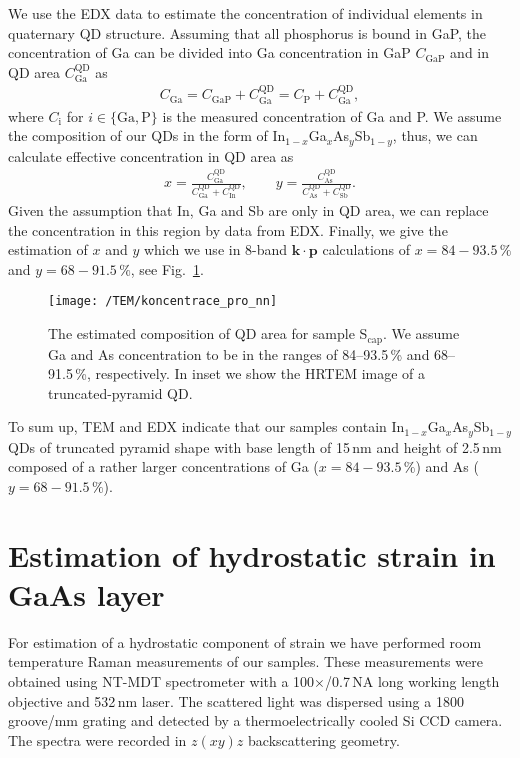 We use the EDX data to estimate the concentration of individual elements in quaternary QD structure. Assuming that all phosphorus is bound in GaP, the concentration of Ga can be divided into Ga concentration in GaP $C_\mathrm{GaP}$ and in QD area $C_\mathrm{Ga}^\mathrm{QD}$ as
%
\begin{eqnarray}
C_\mathrm{Ga}=C_\mathrm{GaP}+C_\mathrm{Ga}^\mathrm{QD}=C_\mathrm{P}+C_\mathrm{Ga}^\mathrm{QD},
\end{eqnarray}
%
where $C_\mathrm{i}$ for $i \in \{\mathrm{Ga}, \mathrm{P}\}$ is the measured concentration of Ga and P. We assume the composition of our QDs in the form of In$_{1-x}$Ga$_{x}$As$_y$Sb$_{1-y}$, thus, we can calculate effective concentration in QD area as
%
\begin{eqnarray}
x=\frac{C_\mathrm{Ga}^\mathrm{QD}}{C_\mathrm{Ga}^\mathrm{QD}+C_\mathrm{In}^\mathrm{QD}},\qquad
y=\frac{C_\mathrm{As}^\mathrm{QD}}{C_\mathrm{As}^\mathrm{QD}+C_\mathrm{Sb}^\mathrm{QD}}.
\end{eqnarray}
%
Given the assumption that In, Ga and Sb are only in QD area, we can replace the concentration in this region by data from EDX. Finally, we give the estimation of $x$ and $y$ which we use in 8-band $\mathbf{k\cdot p}$ calculations of $x=84-93.5\,\%$ and $y=68-91.5\,\%$, see Fig.~\ref{fig:concentration_estimation}.


\begin{figure}
	\centering
	\texttt{[image: /TEM/koncentrace\_pro\_nn]} %
	\caption{The estimated composition of QD area for sample S$_\mathrm{cap}$. We assume Ga and As concentration to be in the ranges of 84--93.5$\,$\% and 68--91.5$\,$\%, respectively. In inset we show the HRTEM image of a truncated-pyramid QD.}
	\label{fig:concentration_estimation}
\end{figure}

To sum up, TEM and EDX indicate that our samples contain In$_{1-x}$Ga$_{x}$As$_y$Sb$_{1-y}$ QDs of truncated pyramid shape with base length of 15$\,$nm and height of 2.5$\,$nm composed of a rather larger concentrations of Ga ($x=84-93.5\,\%$) and As ($y=68-91.5\,\%$).

\section{Estimation of hydrostatic strain in GaAs layer}
For estimation of a hydrostatic component of strain we have performed room temperature Raman measurements of our samples. These measurements were obtained using NT-MDT spectrometer with a 100$\times$/0.7$\,$NA long working length objective and 532$\,$nm laser. The scattered light was dispersed using a 1800$\,$groove/mm grating and detected by a thermoelectrically cooled Si CCD camera. The spectra were recorded in $z(xy)z$ backscattering geometry.

